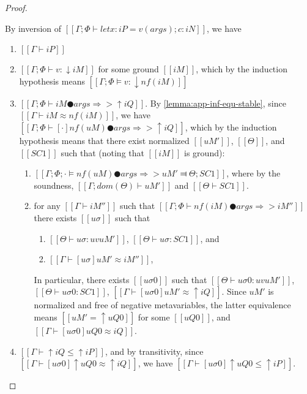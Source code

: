 \begin{proof}
\begin{caseof}
            By inversion of 
            $[[Γ ; Φ ⊢ let x:iP = v(args); c : iN]]$,
            we have
            \begin{enumerate}
                \item $[[Γ ⊢ iP]]$
                \item $[[Γ ; Φ ⊢ v : ↓iM]]$ for some ground $[[iM]]$,
                    which by the induction hypothesis means
                    $[[Γ ; Φ ⊨ v : ↓nf(iM)]]$
                \item $[[Γ ; Φ ⊢ iM ● args ⇒> ↑iQ]]$. 
                    By \cref{lemma:app-inf-equ-stable}, since
                    $[[Γ ⊢ iM ≈ nf(iM)]]$, we have
                    $[[Γ ; Φ ⊢ [·]nf(uM) ● args ⇒> ↑iQ]]$, 
                    which by the induction hypothesis means 
                    that there exist normalized 
                    $[[uM']]$, $[[Θ]]$, and $[[SC1]]$ such that
                    (noting that $[[iM]]$ is ground):
                    \begin{enumerate}
                        \item $[[ Γ; Φ; · ⊨ nf(uM) ● args ⇒> uM' ⫤ Θ; SC1 ]]$,
                            where by the soundness, $[[Γ; dom(Θ) ⊢ uM']]$ and $[[Θ ⊢ SC1]]$.
                        \item for any $[[Γ ⊢ iM'']]$ 
                            such that $[[Γ; Φ ⊢ nf(iM) ● args ⇒> iM'']]$
                            there exists $[[uσ]]$ such that 
                            \begin{enumerate}
                                \item $[[ Θ ⊢ uσ : uv uM' ]]$, $[[ Θ ⊢ uσ : SC1 ]]$, and 
                                \item $[[Γ ⊢ [uσ]uM' ≈ iM'']]$,
                            \end{enumerate}
                            In particular, there exists
                            $[[uσ0]]$
                            such that 
                            $[[ Θ ⊢ uσ0 : uv uM']]$,
                            $[[ Θ ⊢ uσ0 : SC1]]$,
                            $[[Γ ⊢ [uσ0]uM' ≈ ↑iQ]]$.
                            Since $uM'$ is normalized and free of negative metavariables,
                            the latter equivalence means
                            $[[uM' = ↑uQ0]]$ for some $[[uQ0]]$, and $[[Γ ⊢ [uσ0]uQ0 ≈ iQ]]$.
                    \end{enumerate}
                \item $[[Γ ⊢ ↑iQ ≤ ↑iP]]$,
                    and by transitivity, since $[[Γ ⊢ [uσ0]↑uQ0 ≈ ↑iQ]]$,
                    we have $[[Γ ⊢ [uσ0]↑uQ0 ≤ ↑iP]]$.
                    

\end{enumerate}
\end{caseof}
\end{proof}
